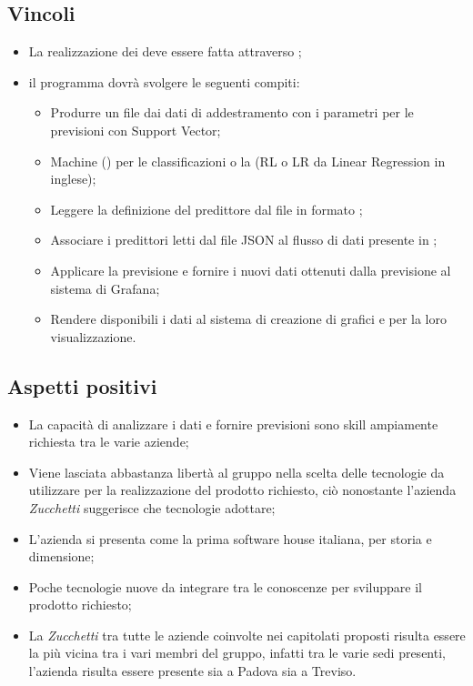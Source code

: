 \subsection{Vincoli}
\begin{itemize}
\item La realizzazione dei  deve essere fatta attraverso ;
\item il programma dovrà svolgere le seguenti compiti:
\begin{itemize}
\item Produrre un file  dai dati di addestramento con i parametri per le previsioni con Support Vector;
\item Machine () per le classificazioni o la  (RL o LR da Linear Regression in inglese);
\item Leggere la definizione del predittore dal file in formato ;
\item Associare i predittori letti dal file JSON al flusso di dati presente in ;
\item Applicare la previsione e fornire i nuovi dati ottenuti dalla previsione al sistema di Grafana;
\item Rendere disponibili i dati al sistema di creazione di grafici e  per la loro visualizzazione.
\end{itemize}
\end{itemize}

\subsection{Aspetti positivi}
\begin{itemize}
\item La capacità di analizzare i dati e fornire previsioni sono skill ampiamente richiesta tra le varie aziende;
\item Viene lasciata abbastanza libertà al gruppo nella scelta delle tecnologie da utilizzare per la realizzazione del prodotto richiesto, ciò nonostante l'azienda \textit{Zucchetti} suggerisce che tecnologie adottare;
\item L'azienda si presenta come la prima software house italiana, per storia e dimensione;
\item Poche tecnologie nuove da integrare tra le conoscenze per sviluppare il prodotto richiesto;
\item La \textit{Zucchetti} tra tutte le aziende coinvolte nei capitolati proposti risulta essere la più vicina tra i vari membri del gruppo, infatti tra le varie sedi presenti, l'azienda risulta essere presente sia a Padova sia a Treviso.

\end{itemize}

